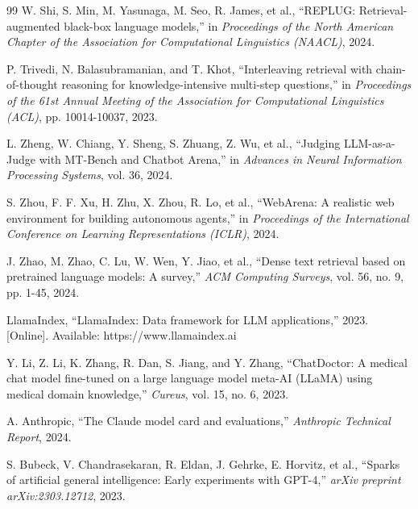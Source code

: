\documentclass[12pt,a4paper]{report}
\begin{document}
\begin{thebibliography}{99}
W. Shi, S. Min, M. Yasunaga, M. Seo, R. James, et al., ``REPLUG: Retrieval-augmented black-box language models,'' in \textit{Proceedings of the North American Chapter of the Association for Computational Linguistics (NAACL)}, 2024.

P. Trivedi, N. Balasubramanian, and T. Khot, ``Interleaving retrieval with chain-of-thought reasoning for knowledge-intensive multi-step questions,'' in \textit{Proceedings of the 61st Annual Meeting of the Association for Computational Linguistics (ACL)}, pp. 10014-10037, 2023.

L. Zheng, W. Chiang, Y. Sheng, S. Zhuang, Z. Wu, et al., ``Judging LLM-as-a-Judge with MT-Bench and Chatbot Arena,'' in \textit{Advances in Neural Information Processing Systems}, vol. 36, 2024.

S. Zhou, F. F. Xu, H. Zhu, X. Zhou, R. Lo, et al., ``WebArena: A realistic web environment for building autonomous agents,'' in \textit{Proceedings of the International Conference on Learning Representations (ICLR)}, 2024.

J. Zhao, M. Zhao, C. Lu, W. Wen, Y. Jiao, et al., ``Dense text retrieval based on pretrained language models: A survey,'' \textit{ACM Computing Surveys}, vol. 56, no. 9, pp. 1-45, 2024.

LlamaIndex, ``LlamaIndex: Data framework for LLM applications,'' 2023. [Online]. Available: https://www.llamaindex.ai

Y. Li, Z. Li, K. Zhang, R. Dan, S. Jiang, and Y. Zhang, ``ChatDoctor: A medical chat model fine-tuned on a large language model meta-AI (LLaMA) using medical domain knowledge,'' \textit{Cureus}, vol. 15, no. 6, 2023.

A. Anthropic, ``The Claude model card and evaluations,'' \textit{Anthropic Technical Report}, 2024.

S. Bubeck, V. Chandrasekaran, R. Eldan, J. Gehrke, E. Horvitz, et al., ``Sparks of artificial general intelligence: Early experiments with GPT-4,'' \textit{arXiv preprint arXiv:2303.12712}, 2023.

\end{thebibliography}
\end{document}
